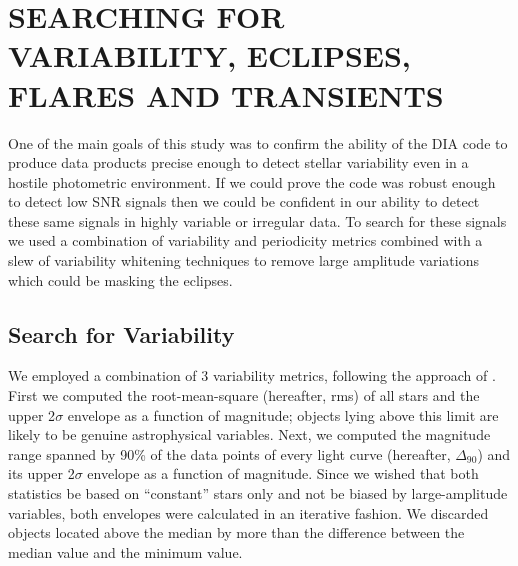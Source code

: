 %
%
%

\renewcommand*{\thefootnote}{\fnsymbol{footnote}}
\chapter[\uppercase{Searching for Variability, Eclipses, Flares and Transients}]{\uppercase{Searching for Variability, Eclipses, Flares and Transients} }
\renewcommand*{\thefootnote}{\arabic{footnote}}
\setcounter{footnote}{0}

One of the main goals of this study was to confirm the ability of the DIA code to produce data products precise enough to detect stellar variability even in a hostile photometric environment. If we could prove the code was robust enough to detect low SNR signals then we could be confident in our ability to detect these same signals in highly variable or irregular data. To search for these signals we used a combination of variability and periodicity metrics combined with a slew of variability whitening techniques to remove large amplitude variations which could be masking the eclipses. 

\section{Search for Variability \label{subsec:varmetric}}

We employed a combination of 3 variability metrics, following the approach of \citet{Wang2013, Oelkers2015}. First we computed the root-mean-square (hereafter, rms) of all stars and the upper 2$\sigma$ envelope as a function of magnitude; objects lying above this limit are likely to be genuine astrophysical variables. Next, we computed the magnitude range spanned by 90\% of the data points of every light curve (hereafter, $\Delta_{90}$) and its upper 2$\sigma$ envelope as a function of magnitude. Since we wished that both statistics be based on ``constant'' stars only and not be biased by large-amplitude variables, both envelopes were calculated in an iterative fashion. We discarded objects located above the median by more than the difference between the median value and the minimum value.

